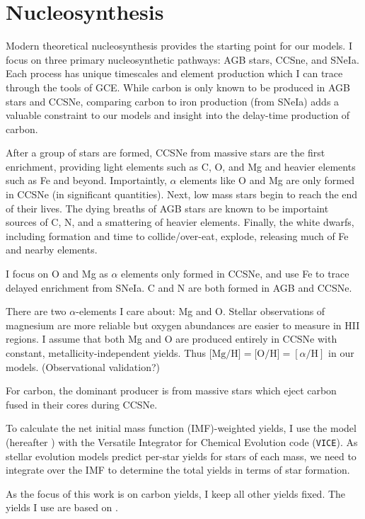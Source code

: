 \documentclass[12pt,oneside]{report}
\newcommand{\JJ}{\citetalias{james+21}}
\newcommand{\VICE}{\texttt{VICE}}
\begin{document}
\chapter{Nucleosynthesis}

Modern theoretical nucleosynthesis provides the starting point for our models.  I focus on three primary nucleosynthetic pathways: AGB stars, CCSne, and SNeIa. Each process has unique timescales and element production which I can trace through the tools of GCE. While carbon is only known to be produced in AGB stars and CCSNe, comparing carbon to iron production (from SNeIa) adds a valuable constraint to our models and insight into the delay-time production of carbon.

After a group of stars are formed, CCSNe from massive stars are the first enrichment, providing light elements such as C, O, and Mg and heavier elements such as Fe and beyond. Importaintly, $\alpha$ elements like O and Mg are only formed in CCSNe (in significant quantities). Next, low mass stars begin to reach the end of their lives. The dying breaths of AGB stars are known to be importaint sources of C, N, and a smattering of heavier elements.  Finally, the white dwarfs, including formation and time to collide/over-eat, explode, releasing much of Fe and nearby elements. 

I focus on O and Mg as $\alpha$ elements only formed in CCSNe, and use Fe to
trace delayed enrichment from SNeIa. C and N are both formed in AGB and CCSNe.

There are two $\alpha$-elements I care about: Mg and O. Stellar observations
of magnesium are more reliable but oxygen abundances are easier to measure in
HII regions. I assume that both Mg and O are produced entirely in CCSNe with
constant, metallicity-independent yields. Thus $\text{[Mg/H]} = \text{[O/H]} =
[\alpha/\text{H}]$ in our models. (Observational validation?)

For carbon, the dominant producer is from massive stars which eject carbon fused in their cores during CCSNe. 

To calculate the net initial mass function (IMF)-weighted yields, I use the \citet{james+21} model (hereafter \JJ) with the Versatile Integrator for Chemical Evolution code (\VICE).
As stellar evolution models predict per-star yields for stars of each mass, we need to integrate over the IMF to determine the total yields in terms of star formation.

As the focus of this work is on carbon yields, I keep all other yields fixed. The yields I use are based on \citet{james+21, james+22}. 
\end{document}
